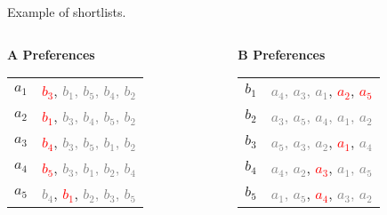 \documentclass[aspectratio=169,xcolor=dvipsnames]{beamer}
\begin{document}
\begin{frame}{Example of shortlists.}
    \begin{columns}[t]
    \begin{column}{0.45\textwidth}
      \textbf{A Preferences}\\[6pt]
      \begin{tabular}{r@{: }l}
        $a_1$ & \textcolor{red}{$b_3$}, \textcolor{gray}{$b_1$, $b_5$, $b_4$, $b_2$} \\
        $a_2$ & \textcolor{red}{$b_1$}, \textcolor{gray}{$b_3$, $b_4$, $b_5$, $b_2$} \\
        $a_3$ & \textcolor{red}{$b_4$}, \textcolor{gray}{$b_3$, $b_5$, $b_1$, $b_2$} \\
        $a_4$ & \textcolor{red}{$b_5$}, \textcolor{gray}{$b_3$, $b_1$, $b_2$, $b_4$} \\
        $a_5$ & \textcolor{gray}{$b_4$}, \textcolor{red}{$b_1$}, \textcolor{gray}{$b_2$, $b_3$, $b_5$} \\
      \end{tabular}
    \end{column}

    \begin{column}{0.45\textwidth}
      \textbf{B Preferences}\\[6pt]
      \begin{tabular}{r@{: }l}
        $b_1$ & \textcolor{gray}{$a_4$, $a_3$, $a_1$}, \textcolor{red}{$a_2$}, \textcolor{red}{$a_5$} \\
        $b_2$ & \textcolor{gray}{$a_3$, $a_5$, $a_4$, $a_1$, $a_2$} \\
        $b_3$ & \textcolor{gray}{$a_5$, $a_3$, $a_2$}, \textcolor{red}{$a_1$}, \textcolor{gray}{$a_4$} \\
        $b_4$ & \textcolor{gray}{$a_4$, $a_2$}, \textcolor{red}{$a_3$}, \textcolor{gray}{$a_1$, $a_5$} \\
        $b_5$ & \textcolor{gray}{$a_1$, $a_5$}, \textcolor{red}{$a_4$}, \textcolor{gray}{$a_3$, $a_2$} \\
      \end{tabular}
    \end{column}
  \end{columns}
\end{frame}
\end{document}
